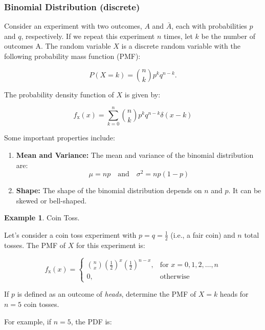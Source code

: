 \documentclass[12pt]{book}
\theoremstyle{definition}
\newtheorem{exmp}{Example}[chapter]
\begin{document}
\subsubsection{Binomial Distribution (discrete)}

Consider an experiment with two outcomes, \(A\) and \(\bar A\), each with probabilities \(p\) and \(q\), respectively. If we repeat this experiment \(n\) times, let \(k\) be the number of outcomes A. The random variable \(X\) is a discrete random variable with the following probability mass function (PMF):

\[
P(X = k) = \binom{n}{k} p^k q^{n-k}.
\]


The probability density function of \(X\) is given by:

\[
f_\mathrm{x}(x) = \sum_{k=0}^n\binom{n}{k} p^k q^{n-k} \delta(x-k)
\]


Some important properties include: 
\begin{enumerate}

    \item \textbf{Mean and Variance:} The mean and variance of the binomial distribution are:
    \[
    \mu = np \quad \text{and} \quad \sigma^2 = np(1-p)
    \]

    \item \textbf{Shape:} The shape of the binomial distribution depends on \(n\) and \(p\). It can be skewed or bell-shaped.

\end{enumerate}

\begin{tcolorbox}
\begin{exmp}{Coin Toss.}

Let's consider a coin toss experiment with \(p = q = \frac{1}{2}\) (i.e., a fair coin) and \(n\) total tosses. The PMF of \(X\) for this experiment is:

\[
f_\mathrm{x}(x) = \begin{cases}
\binom{n}{x} \left(\frac{1}{2}\right)^x \left(\frac{1}{2}\right)^{n-x}, & \text{for } x = 0, 1, 2, \ldots, n \\
0, & \text{otherwise}
\end{cases}
\]

If \(p\) is defined as an outcome of \emph{heads}, determine the PMF of \(X=k\) heads for \(n=5\) coin tosses.
\end{exmp}
\end{tcolorbox}

For example, if \(n = 5\), the PDF is:
\end{document}
